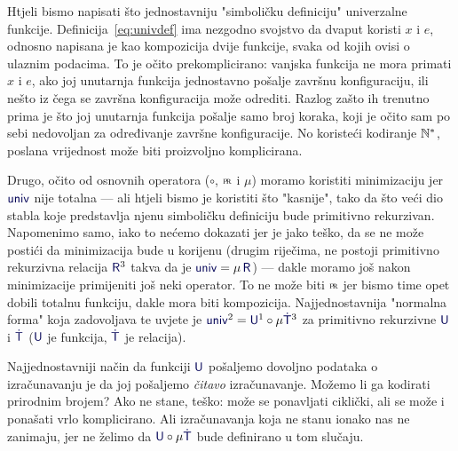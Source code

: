 Htjeli bismo napisati što jednostavniju "simboličku definiciju" univerzalne funkcije. Definicija~\eqref{eq:univdef} ima nezgodno svojstvo da dvaput koristi $x$ i $e$, odnosno napisana je kao kompozicija dvije funkcije, svaka od kojih ovisi o ulaznim podacima. To je očito prekomplicirano: vanjska funkcija ne mora primati $x$ i $e$, ako joj unutarnja funkcija jednostavno pošalje završnu konfiguraciju, ili nešto iz čega se završna konfiguracija može odrediti. Razlog zašto ih trenutno prima je što joj unutarnja funkcija pošalje samo broj koraka, koji je očito sam po sebi nedovoljan za određivanje završne konfiguracije. No koristeći kodiranje ${\mathbb N}^*$, poslana vrijednost može biti proizvoljno komplicirana.

Drugo, očito od osnovnih operatora ($\circ$, $\pr$ i $\mu$) moramo koristiti minimizaciju jer $\f{univ}$ nije totalna --- ali htjeli bismo je koristiti što "kasnije", tako da što veći dio stabla koje predstavlja njenu simboličku definiciju bude primitivno rekurzivan. Napomenimo samo, iako to nećemo dokazati jer je jako teško, da se ne može postići da minimizacija bude u korijenu (drugim riječima, ne postoji primitivno rekurzivna relacija $\f{R}^3$ takva da je $\f{univ}=\mu\,\f{R}$) --- dakle moramo još nakon minimizacije primijeniti još neki operator. To ne može biti $\pr$ jer bismo time opet dobili totalnu funkciju, dakle mora biti kompozicija. Najjednostavnija "normalna forma" koja zadovoljava te uvjete je $\f{univ}^2=\f U^1\circ\mu\f{\dot T}^3$ za primitivno rekurzivne $\f U$ i $\f{\dot T}$ ($\f U$ je funkcija, $\f{\dot T}$ je relacija).


Najjednostavniji način da funkciji $\f U$ pošaljemo dovoljno podataka o izračunavanju je da joj pošaljemo \emph{čitavo} izračunavanje. Možemo li ga kodirati prirodnim brojem? Ako ne stane, teško: može se ponavljati ciklički, ali se može i ponašati vrlo komplicirano. Ali izračunavanja koja ne stanu ionako nas ne zanimaju, jer ne želimo da $\f U\circ\mu\f{\dot T}$ bude definirano u tom slučaju.

